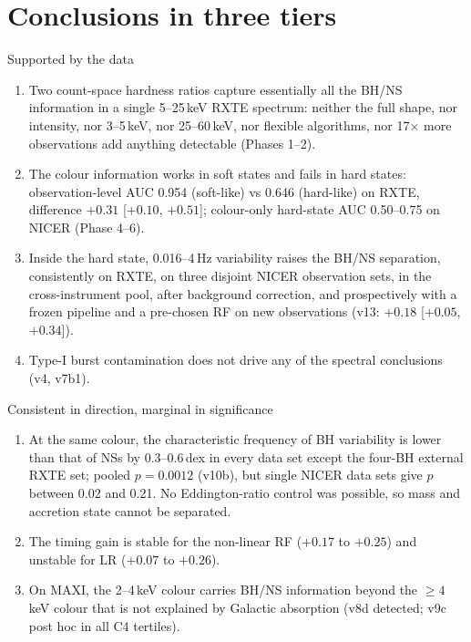 \section{Conclusions in three tiers}\label{sec:synthtiers}
\begin{keybox}{Supported by the data}
\begin{enumerate}
\item Two count-space hardness ratios capture essentially all the BH/NS information in a single 5--25\,keV RXTE spectrum: neither the full
shape, nor intensity, nor 3--5\,keV, nor 25--60\,keV, nor flexible algorithms, nor 17$\times$ more observations add anything detectable
(Phases 1--2).
\item The colour information works in soft states and fails in hard states: observation-level AUC 0.954 (soft-like) vs 0.646 (hard-like) on
RXTE, difference $+0.31$ [$+0.10$, $+0.51$]; colour-only hard-state AUC 0.50--0.75 on NICER (Phase 4--6).
\item Inside the hard state, 0.016--4\,Hz variability raises the BH/NS separation, consistently on RXTE, on three disjoint NICER observation
sets, in the cross-instrument pool, after background correction, and prospectively with a frozen pipeline and a pre-chosen RF on new
observations (v13: $+0.18$ [$+0.05$, $+0.34$]).
\item Type-I burst contamination does not drive any of the spectral conclusions (v4, v7b1).
\end{enumerate}
\end{keybox}

\begin{keybox}{Consistent in direction, marginal in significance}
\begin{enumerate}
\item At the same colour, the characteristic frequency of BH variability is lower than that of NSs by 0.3--0.6\,dex in every data set except
the four-BH external RXTE set; pooled $p=0.0012$ (v10b), but single NICER data sets give $p$ between 0.02 and 0.21. No Eddington-ratio
control was possible, so mass and accretion state cannot be separated.
\item The timing gain is stable for the non-linear RF ($+0.17$ to $+0.25$) and unstable for LR ($+0.07$ to $+0.26$).
\item On MAXI, the 2--4\,keV colour carries BH/NS information beyond the $\ge4$\,keV colour that is not explained by Galactic absorption
(v8d detected; v9c post hoc in all C4 tertiles).
\end{enumerate}
\end{keybox}

